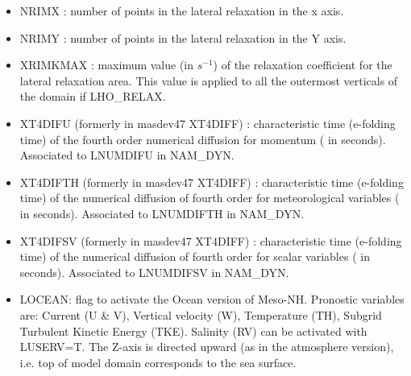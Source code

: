 \begin{itemize}
\item
{}
NRIMX : number of points  in the lateral relaxation  in the x axis. 

\item
{}
NRIMY : number of points in the lateral relaxation  in the Y axis.
\item
{}
XRIMKMAX : maximum value (in $s^{-1}$)  of the relaxation coefficient
for the lateral relaxation area. This value is applied to all the
outermost verticals of the domain if LHO\_RELAX. 

\item
{}
XT4DIFU (formerly in masdev47 XT4DIFF) : characteristic time (e-folding time)  
of the fourth order numerical diffusion for momentum ( in seconds). Associated to LNUMDIFU in NAM\_DYN.

\item
{}
XT4DIFTH (formerly in masdev47 XT4DIFF) : characteristic time (e-folding time)  of the numerical diffusion
of fourth order for meteorological variables ( in seconds). Associated to LNUMDIFTH in NAM\_DYN.

\item
{}
XT4DIFSV (formerly in masdev47 XT4DIFF) : characteristic time (e-folding time)  of the numerical diffusion
of fourth order for scalar variables ( in seconds). Associated to LNUMDIFSV in NAM\_DYN.

\item
LOCEAN: flag to activate the Ocean version of Meso-NH. Pronostic variables are: Current (U \& V), Vertical velocity (W), Temperature (TH), Subgrid Turbulent Kinetic Energy (TKE). Salinity (RV) can be activated with LUSERV=T. The Z-axis is directed upward (as in the atmosphere version), i.e. top of model domain corresponds to the sea surface. 


\end{itemize}
